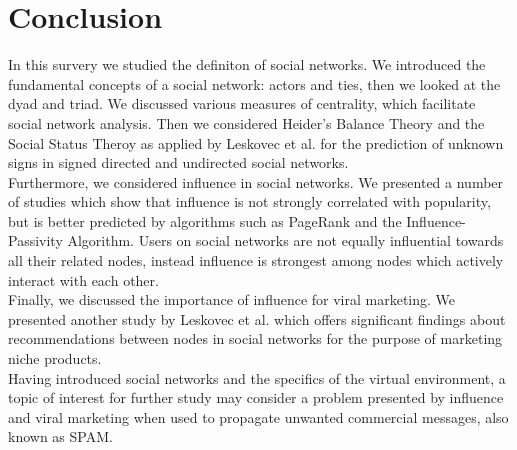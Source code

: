 \documentclass[conference,letterpaper]{IEEEtran}
\begin{document}
\section{Conclusion}

In this survery we studied the definiton of social networks. We introduced the fundamental concepts of
a social network: actors and ties, then we looked at the dyad and triad. We discussed various measures
of centrality, which facilitate social network analysis. Then we considered Heider’s Balance Theory and
the Social Status Theroy as applied by Leskovec et al. for the prediction of unknown signs in signed
directed and undirected social networks. \\
Furthermore, we considered influence in social networks. We presented a number of studies which show
that influence is not strongly correlated with popularity, but is better predicted by algorithms such
as PageRank and the Influence-Passivity Algorithm. Users on social networks are not equally influential
towards all their related nodes, instead influence is strongest among nodes which actively interact with each other.\\
Finally, we discussed the importance of influence for viral marketing. We presented another study by Leskovec et al.
which offers significant findings about recommendations between nodes in social networks for the purpose of marketing
niche products. \\
Having introduced social networks and the specifics of the virtual environment, a topic of interest for further
study may consider a problem presented by influence and viral marketing when used to propagate unwanted commercial messages,
also known as SPAM.\\

\end{document}

